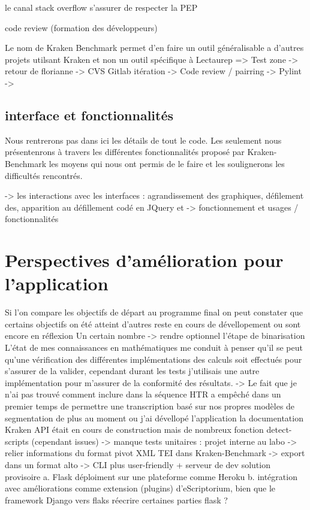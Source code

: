 le canal stack overflow 
s'assurer de respecter la PEP 

code review (formation des développeurs)

Le nom de Kraken Benchmark permet d'en faire un outil généralisable a d'autres projets utilsant Kraken et non un outil spécifique à Lectaurep => 
Test zone -> retour de florianne 
-> CVS Gitlab itération 
-> Code review / pairring 
-> Pylint -> 



\subsection{interface et fonctionnalités}\label{inter_fonc}

Nous rentrerons pas dans ici les détails de tout le code. Les seulement nous présentenrons à travers les différentes fonctionnalités proposé par Kraken-Benchmark les moyens qui nous ont permis de le faire et les soulignerons les difficultés rencontrés.  


-> les interactions avec les interfaces : agrandissement des graphiques, défilement des, apparition au défillement codé en JQuery et 
-> fonctionnement et usages / fonctionnalités 

\section{Perspectives d'amélioration pour l'application}\label{perspectives_amélios}

Si l'on compare les objectifs de départ au programme final on peut constater que certains objectifs on été atteint d'autres reste en cours de dévellopement ou sont encore en réflexion 
Un certain nombre 
-> rendre optionnel l'étape de binarisation
L'état de mes connaissances en mathématiques me conduit à penser qu'il se peut qu'une vérification des différentes implémentations des calculs soit effectués pour s'assurer de la valider, cependant durant les tests j'utilisais une autre implémentation pour m'assurer de la conformité des résultats. 
-> Le fait que je n'ai pas trouvé comment inclure dans la séquence HTR a empêché dans un premier temps de permettre une transcription basé sur nos propres modèles de segmentation de plus au moment ou j'ai dévellopé l'application la documentation Kraken API était en cours de construction mais de nombreux fonction detect-scripts (cependant issues)
-> manque tests unitaires : projet interne au labo 
-> relier informations du format pivot XML TEI dans Kraken-Benchmark 
-> export dans un format alto
-> CLI plus user-friendly + serveur de dev solution provisoire
a. Flask déploiment sur une plateforme comme Heroku 
b. intégration avec améliorations comme extension (plugins) d'eScriptorium, bien que le framework Django vers flaks réecrire certaines parties flask ? 


